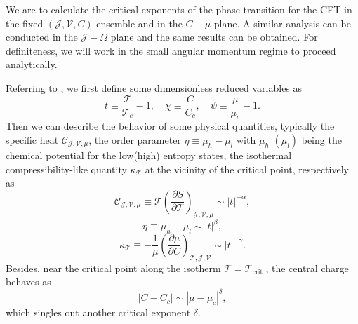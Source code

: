 \documentclass[a4paper,11pt]{article}
\def\T{\mathcal{T}} \def\O{\mathcal{O}} \def\S{\mathcal{S}}\def\J{\mathcal{J}}\def\V{\mathcal{V}}\def\Q{\mathcal{Q}}\def\F{\mathcal{F}}
\begin{document}
We are to calculate the critical exponents of the phase transition for the CFT in the fixed $(\mathcal{J}, \mathcal{V}, C)$ ensemble and in the $C-\mu$ plane. A similar analysis can be conducted  in the $\J-\Omega$ plane and the same results can be obtained. For definiteness, we will work in the small angular momentum regime to proceed analytically.
 
Referring to \cite{Gunasekaran:2012dq}, we first define some dimensionless reduced variables as
\begin{equation}\label{cetcp}
t \equiv \frac{\mathcal{T}}{\mathcal{T}_c}-1, \quad \chi \equiv \frac{C}{C_c}, \quad \psi \equiv \frac{\mu}{\mu_c}-1.
\end{equation}
Then we can describe the behavior of some physical quantities, typically the specific heat $\mathcal{C}_{\mathcal{J}, \mathcal{V}, \mu}$, the order parameter $\eta \equiv \mu_h-\mu_l$ with $\mu_h$ $\left(\mu_l\right)$ being the chemical potential for the low(high) entropy states, the isothermal compressibility-like quantity $\kappa_\T$    at the vicinity of the critical point, respectively as
\begin{equation}\label{matc}
\mathcal{C}_{\mathcal{J}, \mathcal{V}, \mu} \equiv \mathcal{T}\left(\frac{\partial S}{\partial \mathcal{T}}\right)_{\mathcal{J}, \mathcal{V}, \mu} \sim|t|^{-\alpha},
\end{equation}
\begin{equation}
\eta \equiv \mu_h-\mu_l \sim|t|^\beta,
\end{equation}
\begin{equation}
\kappa_\mathcal{T} \equiv-\frac{1}{\mu}\left(\frac{\partial \mu}{\partial C}\right)_{\mathcal{T}, \J, \mathcal{V}} \sim|t|^{-\gamma}.
\end{equation}
Besides, near the critical point along the isotherm $\mathcal{T}=\mathcal{T}_{\text {crit }}$, the central charge behaves as
\begin{equation}
\left|C-C_c\right| \sim\left|\mu-\mu_c\right|^\delta,
\end{equation}
which singles out another critical exponent $\delta$.
\end{document}
